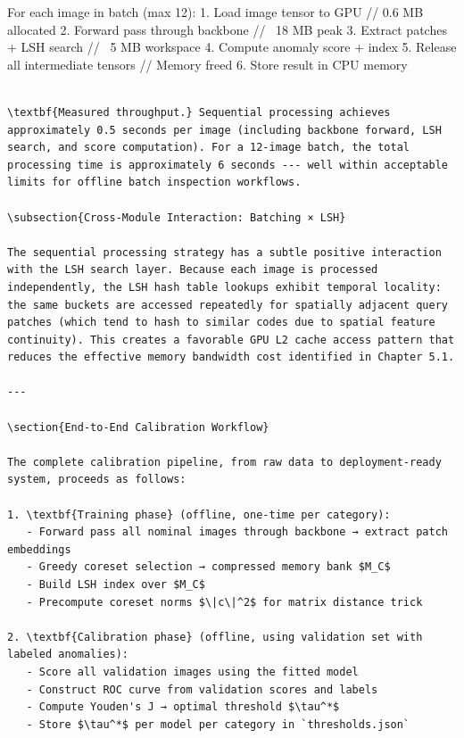 \documentclass[12pt,a4paper,oneside]{report}
\begin{document}
For each image in batch (max 12):
    1. Load image tensor to GPU          // 0.6 MB allocated
    2. Forward pass through backbone     // ~18 MB peak
    3. Extract patches + LSH search      // ~5 MB workspace
    4. Compute anomaly score + index
    5. Release all intermediate tensors  // Memory freed
    6. Store result in CPU memory
\begin{verbatim}

\textbf{Measured throughput.} Sequential processing achieves approximately 0.5 seconds per image (including backbone forward, LSH search, and score computation). For a 12-image batch, the total processing time is approximately 6 seconds --- well within acceptable limits for offline batch inspection workflows.

\subsection{Cross-Module Interaction: Batching × LSH}

The sequential processing strategy has a subtle positive interaction with the LSH search layer. Because each image is processed independently, the LSH hash table lookups exhibit temporal locality: the same buckets are accessed repeatedly for spatially adjacent query patches (which tend to hash to similar codes due to spatial feature continuity). This creates a favorable GPU L2 cache access pattern that reduces the effective memory bandwidth cost identified in Chapter 5.1.

---

\section{End-to-End Calibration Workflow}

The complete calibration pipeline, from raw data to deployment-ready system, proceeds as follows:

1. \textbf{Training phase} (offline, one-time per category):
   - Forward pass all nominal images through backbone → extract patch embeddings
   - Greedy coreset selection → compressed memory bank $M_C$
   - Build LSH index over $M_C$
   - Precompute coreset norms $\|c\|^2$ for matrix distance trick

2. \textbf{Calibration phase} (offline, using validation set with labeled anomalies):
   - Score all validation images using the fitted model
   - Construct ROC curve from validation scores and labels
   - Compute Youden's J → optimal threshold $\tau^*$
   - Store $\tau^*$ per model per category in `thresholds.json`


\end{verbatim}
\end{document}
